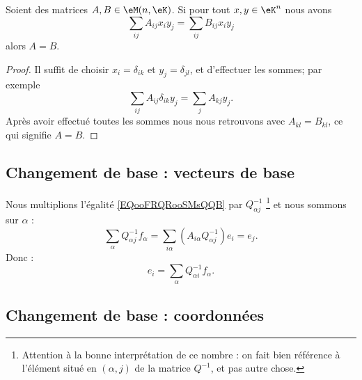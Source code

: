 \begin{lemma}       \label{LEMooLXAHooPRyHaF}
    Soient des matrices \( A,B\in \eM(n,\eK)\). Si pour tout \( x,y\in \eK^n\) nous avons
    \begin{equation}
        \sum_{ij}A_{ij}x_iy_j=\sum_{ij}B_{ij}x_iy_j
    \end{equation}
    alors \( A=B\).
\end{lemma}

\begin{proof}
    Il suffit de choisir \( x_i=\delta_{ik}\) et \( y_j=\delta_{jl}\), et d'effectuer les sommes; par exemple
    \begin{equation}
        \sum_{ij}A_{ij}\delta_{ik}y_j=\sum_jA_{kj}y_j.
    \end{equation}
    Après avoir effectué toutes les sommes nous nous retrouvons avec \( A_{kl}=B_{kl}\), ce qui signifie \( A=B\).
\end{proof}

\subsection{Changement de base : vecteurs de base}

Nous multiplions l'égalité \eqref{EQooFRQRooSMsQQB} par \( Q^{-1}_{\alpha j}\) \footnote{Attention à la bonne interprétation de ce nombre : on fait bien référence à l'élément situé en \( (\alpha, j) \) de la matrice \( Q^{-1} \), et pas autre chose.} et nous sommons sur \( \alpha\) :
\begin{equation}
    \sum_{\alpha}Q^{-1}_{\alpha j}f_{\alpha}=\sum_{i\alpha}(A_{i\alpha}Q^{-1}_{\alpha j})e_i=e_j.
\end{equation}
Donc :
\begin{equation}    \label{EQooZQPAooAbKAdg}
    e_i=\sum_{\alpha}Q^{-1}_{\alpha i}f_{\alpha}.
\end{equation}

\subsection{Changement de base : coordonnées}

